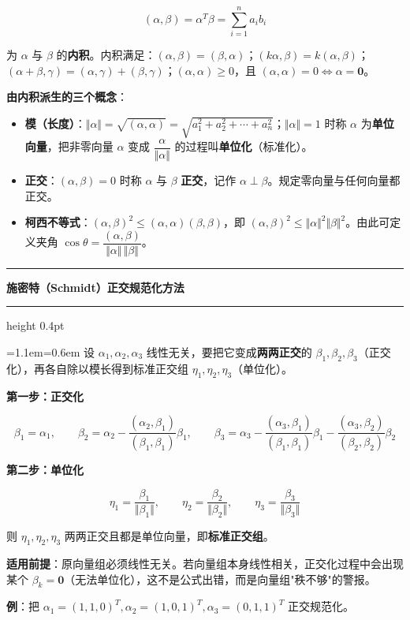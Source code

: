 \documentclass[11pt,openany,UTF8]{ctexbook}
\newcommand{\callouthead}[2]{%
  \par\addvspace{7pt}\noindent
  {\color{#1}\rule[-0.15em]{3pt}{1.05em}}\hspace{0.5em}%
  {\bfseries\color{#1}#2}\par\nobreak\vspace{-0.35em}%
  {\color{rulesep}\hrule height 0.4pt}\nobreak\vspace{0.45em}%
  \begingroup\small\setlength{\parindent}{0pt}%
  \leftskip=1.1em\rightskip=0.6em\noindent\ignorespaces}
\newcommand{\calloutend}{\par\endgroup\addvspace{7pt}}
\newenvironment{callkey}[1]{\callouthead{keybar}{#1}}{\calloutend}
\begin{document}
\[(\alpha,\beta)=\alpha^T\beta=\sum_{i=1}^{n}a_ib_i\]

为 $\alpha$ 与 $\beta$ 的\textbf{内积}。内积满足：$(\alpha,\beta)=(\beta,\alpha)$；$(k\alpha,\beta)=k(\alpha,\beta)$；$(\alpha+\beta,\gamma)=(\alpha,\gamma)+(\beta,\gamma)$；$(\alpha,\alpha)\ge 0$，且 $(\alpha,\alpha)=0\iff\alpha=\mathbf{0}$。

\textbf{由内积派生的三个概念}：

\begin{itemize}
\item \textbf{模（长度）}：$\Vert\alpha\Vert=\sqrt{(\alpha,\alpha)}=\sqrt{a_1^2+a_2^2+\cdots+a_n^2}$；$\Vert\alpha\Vert=1$ 时称 $\alpha$ 为\textbf{单位向量}，把非零向量 $\alpha$ 变成 $\dfrac{\alpha}{\Vert\alpha\Vert}$ 的过程叫\textbf{单位化}（标准化）。
\item \textbf{正交}：$(\alpha,\beta)=0$ 时称 $\alpha$ 与 $\beta$ \textbf{正交}，记作 $\alpha\perp\beta$。规定零向量与任何向量都正交。
\item \textbf{柯西不等式}：$(\alpha,\beta)^2\le(\alpha,\alpha)(\beta,\beta)$，即 $(\alpha,\beta)^2\le\Vert\alpha\Vert^2\Vert\beta\Vert^2$。由此可定义夹角 $\cos\theta=\dfrac{(\alpha,\beta)}{\Vert\alpha\Vert\,\Vert\beta\Vert}$。
\end{itemize}
\begin{callkey}{施密特（Schmidt）正交规范化方法}
设 $\alpha_1,\alpha_2,\alpha_3$ 线性无关，要把它变成\textbf{两两正交}的 $\beta_1,\beta_2,\beta_3$（正交化），再各自除以模长得到标准正交组 $\eta_1,\eta_2,\eta_3$（单位化）。

\textbf{第一步：正交化}

\[\beta_1=\alpha_1,\qquad
\beta_2=\alpha_2-\frac{(\alpha_2,\beta_1)}{(\beta_1,\beta_1)}\beta_1,\qquad
\beta_3=\alpha_3-\frac{(\alpha_3,\beta_1)}{(\beta_1,\beta_1)}\beta_1-\frac{(\alpha_3,\beta_2)}{(\beta_2,\beta_2)}\beta_2\]

\textbf{第二步：单位化}

\[\eta_1=\frac{\beta_1}{\Vert\beta_1\Vert},\qquad
\eta_2=\frac{\beta_2}{\Vert\beta_2\Vert},\qquad
\eta_3=\frac{\beta_3}{\Vert\beta_3\Vert}\]

则 $\eta_1,\eta_2,\eta_3$ 两两正交且都是单位向量，即\textbf{标准正交组}。

\textbf{适用前提}：原向量组必须线性无关。若向量组本身线性相关，正交化过程中会出现某个 $\beta_k=\mathbf{0}$（无法单位化），这不是公式出错，而是向量组"秩不够"的警报。

\end{callkey}

\textbf{例}：把 $\alpha_1=(1,1,0)^T,\alpha_2=(1,0,1)^T,\alpha_3=(0,1,1)^T$ 正交规范化。
\end{document}
